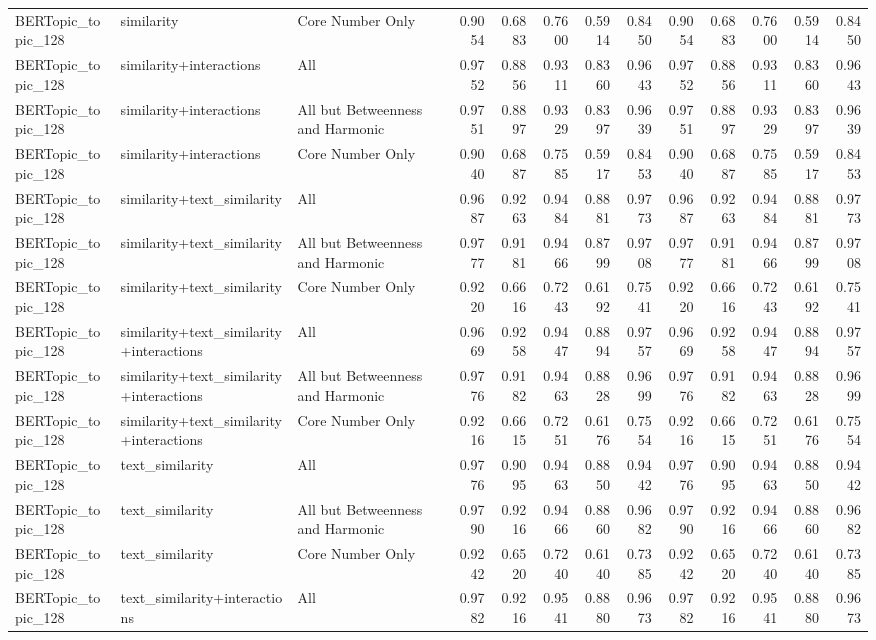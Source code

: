 \begin{tabular}{lllrrrrrrrrrr}
BERTopic_topic_128 & similarity & Core Number Only & 0.9054 & 0.6883 & 0.7600 & 0.5914 & 0.8450 & 0.9054 & 0.6883 & 0.7600 & 0.5914 & 0.8450 \\
BERTopic_topic_128 & similarity+interactions & All & 0.9752 & 0.8856 & 0.9311 & 0.8360 & 0.9643 & 0.9752 & 0.8856 & 0.9311 & 0.8360 & 0.9643 \\
BERTopic_topic_128 & similarity+interactions & All but Betweenness and Harmonic & 0.9751 & 0.8897 & 0.9329 & 0.8397 & 0.9639 & 0.9751 & 0.8897 & 0.9329 & 0.8397 & 0.9639 \\
BERTopic_topic_128 & similarity+interactions & Core Number Only & 0.9040 & 0.6887 & 0.7585 & 0.5917 & 0.8453 & 0.9040 & 0.6887 & 0.7585 & 0.5917 & 0.8453 \\
BERTopic_topic_128 & similarity+text_similarity & All & 0.9687 & 0.9263 & 0.9484 & 0.8881 & 0.9773 & 0.9687 & 0.9263 & 0.9484 & 0.8881 & 0.9773 \\
BERTopic_topic_128 & similarity+text_similarity & All but Betweenness and Harmonic & 0.9777 & 0.9181 & 0.9466 & 0.8799 & 0.9708 & 0.9777 & 0.9181 & 0.9466 & 0.8799 & 0.9708 \\
BERTopic_topic_128 & similarity+text_similarity & Core Number Only & 0.9220 & 0.6616 & 0.7243 & 0.6192 & 0.7541 & 0.9220 & 0.6616 & 0.7243 & 0.6192 & 0.7541 \\
BERTopic_topic_128 & similarity+text_similarity+interactions & All & 0.9669 & 0.9258 & 0.9447 & 0.8894 & 0.9757 & 0.9669 & 0.9258 & 0.9447 & 0.8894 & 0.9757 \\
BERTopic_topic_128 & similarity+text_similarity+interactions & All but Betweenness and Harmonic & 0.9776 & 0.9182 & 0.9463 & 0.8828 & 0.9699 & 0.9776 & 0.9182 & 0.9463 & 0.8828 & 0.9699 \\
BERTopic_topic_128 & similarity+text_similarity+interactions & Core Number Only & 0.9216 & 0.6615 & 0.7251 & 0.6176 & 0.7554 & 0.9216 & 0.6615 & 0.7251 & 0.6176 & 0.7554 \\
BERTopic_topic_128 & text_similarity & All & 0.9776 & 0.9095 & 0.9463 & 0.8850 & 0.9442 & 0.9776 & 0.9095 & 0.9463 & 0.8850 & 0.9442 \\
BERTopic_topic_128 & text_similarity & All but Betweenness and Harmonic & 0.9790 & 0.9216 & 0.9466 & 0.8860 & 0.9682 & 0.9790 & 0.9216 & 0.9466 & 0.8860 & 0.9682 \\
BERTopic_topic_128 & text_similarity & Core Number Only & 0.9242 & 0.6520 & 0.7240 & 0.6140 & 0.7385 & 0.9242 & 0.6520 & 0.7240 & 0.6140 & 0.7385 \\
BERTopic_topic_128 & text_similarity+interactions & All & 0.9782 & 0.9216 & 0.9541 & 0.8880 & 0.9673 & 0.9782 & 0.9216 & 0.9541 & 0.8880 & 0.9673 \\

\end{tabular}
